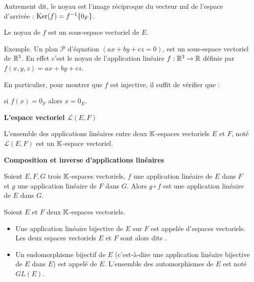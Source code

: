 \documentclass[10pt,class=article,crop=false]{standalone}
\begin{document}
\begin{multicols}{2}
\begin{definition}
	Autrement dit, le noyau est l'image réciproque du vecteur nul de l'espace d'arrivée :
	$\operatorname{Ker}(f) = f^{-1} \{0_F\}$.
\end{definition}



\begin{proposition}
	Le noyau de $f$ est un sous-espace vectoriel de $E$.
\end{proposition}


Exemple. 
Un plan $\mathcal{P}$ d'équation $(ax+by+cz=0)$,
est un sous-espace vectoriel de $\mathbb{R}^3$. 
En effet c'est le noyau de l'application linéaire $f : \mathbb{R}^3 \to \mathbb{R}$ définie par $f(x,y,z)=ax+by+cz$.

\begin{theoreme}
	\sauteligne
\end{theoreme}
En particulier, pour montrer que $f$ est injective, il suffit de vérifier que : \\
\centerline{si $f(x)=0_F$ alors $x=0_E$.}

\textbf{L'espace vectoriel $\mathcal{L}(E,F)$}

\begin{proposition}
	L'ensemble des applications linéaires entre deux $\mathbb{K}$-espaces vectoriels $E$ et $F$, noté $\mathcal{L}(E,F)$ est un $\mathbb{K}$-espace vectoriel.
\end{proposition}

\textbf{Composition et inverse d'applications linéaires}


\begin{proposition}
	Soient $E, F, G$  trois $\mathbb{K}$-espaces vectoriels, $f$ une application linéaire de $E$ dans $F$ et $g$ une application linéaire de $F$ dans $G$. Alors  $g \circ f$ est une application linéaire de $E$ dans $G$.
\end{proposition}

Soient $E$ et $F$ deux $\mathbb{K}$-espaces vectoriels.

\begin{itemize}
	\item Une application linéaire bijective de $E$ sur $F$ est appelée
	 d'espaces vectoriels. Les deux espaces vectoriels $E$ et $F$ sont alors dits .
	
	\item Un endomorphisme bijectif de $E$ (c'est-à-dire une application linéaire bijective de $E$ dans $E$) est appelé  de $E$. L'ensemble des automorphismes de $E$ est noté $GL(E)$.
\end{itemize}


\end{multicols}
\end{document}
